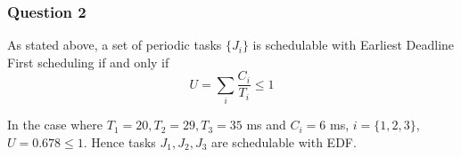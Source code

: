 \subsubsection{Question 2}

As stated above, a set of periodic tasks $\{J_i\}$ is schedulable with Earliest
Deadline First scheduling if and only if $$U = \sum_{i} \dfrac{C_i}{T_i} \leq 1$$

In the case where $T_1 = 20, T_2 = 29, T_3 = 35$ ms and $C_i = 6$ ms,
$i=\{1,2,3\}$, $U=0.678 \leq 1$. Hence tasks $J_1, J_2, J_3$ are schedulable
with EDF.

